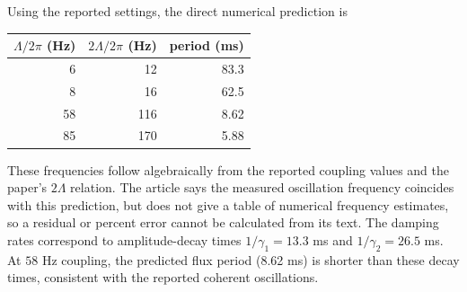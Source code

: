 \documentclass[9pt]{article}
\begin{document}
Using the reported settings, the direct numerical prediction is
\begin{center}
\begin{tabular}{rrr}
\toprule
$\Lambda/2\pi$ (Hz) & $2\Lambda/2\pi$ (Hz) & period (ms)\\
\midrule
6 & 12 & 83.3\\
8 & 16 & 62.5\\
58 & 116 & 8.62\\
85 & 170 & 5.88\\
\bottomrule
\end{tabular}
\end{center}
These frequencies follow algebraically from the reported coupling values and the paper's $2\Lambda$ relation. The article says the measured oscillation frequency coincides with this prediction, but does not give a table of numerical frequency estimates, so a residual or percent error cannot be calculated from its text. The damping rates correspond to amplitude-decay times $1/\gamma_1=13.3$ ms and $1/\gamma_2=26.5$ ms. At $58$ Hz coupling, the predicted flux period (8.62 ms) is shorter than these decay times, consistent with the reported coherent oscillations.
\end{document}
